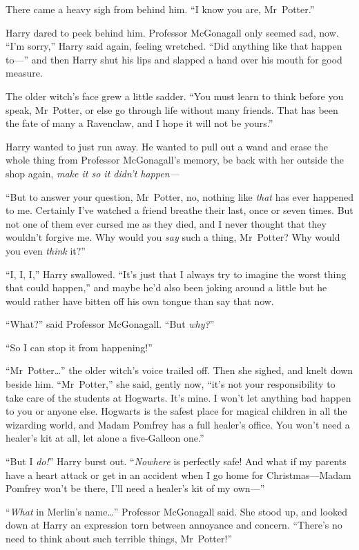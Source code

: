 There came a heavy sigh from behind him. “I know you are, Mr~Potter.”

Harry dared to peek behind him. Professor McGonagall only seemed sad, now. “I’m sorry,” Harry said again, feeling wretched. “Did anything like that happen to—” and then Harry shut his lips and slapped a hand over his mouth for good measure.

The older witch’s face grew a little sadder. “You must learn to think before you speak, Mr~Potter, or else go through life without many friends. That has been the fate of many a Ravenclaw, and I hope it will not be yours.”

Harry wanted to just run away. He wanted to pull out a wand and erase the whole thing from Professor McGonagall’s memory, be back with her outside the shop again, \emph{make it so it didn’t happen—}

“But to answer your question, Mr~Potter, no, nothing like \emph{that} has ever happened to me. Certainly I’ve watched a friend breathe their last, once or seven times. But not one of them ever cursed me as they died, and I never thought that they wouldn’t forgive me. Why would you \emph{say} such a thing, Mr~Potter? Why would you even \emph{think} it?”

“I, I, I,” Harry swallowed. “It’s just that I always try to imagine the worst thing that could happen,” and maybe he’d also been joking around a little but he would rather have bitten off his own tongue than say that now.

“What?” said Professor McGonagall. “But \emph{why?}”

“So I can stop it from happening!”

“Mr~Potter…” the older witch’s voice trailed off. Then she sighed, and knelt down beside him. “Mr~Potter,” she said, gently now, “it’s not your responsibility to take care of the students at Hogwarts. It’s mine. I won’t let anything bad happen to you or anyone else. Hogwarts is the safest place for magical children in all the wizarding world, and Madam Pomfrey has a full healer’s office. You won’t need a healer’s kit at all, let alone a five-Galleon one.”

“But I \emph{do!}” Harry burst out. “\emph{Nowhere} is perfectly safe! And what if my parents have a heart attack or get in an accident when I go home for Christmas—Madam Pomfrey won’t be there, I’ll need a healer’s kit of my own—”

“\emph{What} in Merlin’s name…” Professor McGonagall said. She stood up, and looked down at Harry an expression torn between annoyance and concern. “There’s no need to think about such terrible things, Mr~Potter!”


